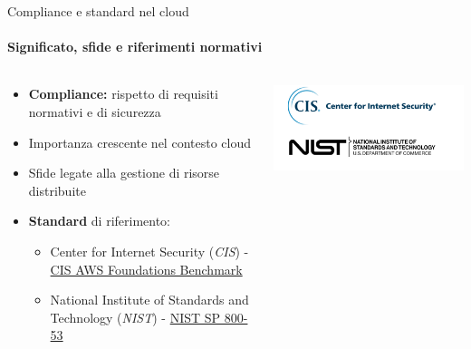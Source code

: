 \documentclass{beamer}
\newcommand{\hrefcol}[2]{\textcolor{cyan}{\href{#1}{#2}}}
\begin{document}
\begin{frame}{Compliance e standard nel cloud}
    \framesubtitle{Significato, sfide e riferimenti normativi}
    \begin{columns}
        \begin{column}{0.6\textwidth}
            \begin{itemize}
                \item \textbf{Compliance:} rispetto di requisiti normativi e di sicurezza
                \item Importanza crescente nel contesto cloud
                \item Sfide legate alla gestione di risorse distribuite
                \item \textbf{Standard} di riferimento:
                \begin{itemize}
                    \item Center for Internet Security (\emph{CIS}) - \hrefcol{https://www.cisecurity.org/}{CIS AWS Foundations Benchmark}
                    \item National Institute of Standards and Technology (\emph{NIST}) - \hrefcol{https://www.nist.gov/}{NIST SP 800-53}
                \end{itemize}
            \end{itemize}
        \end{column}
        \begin{column}{0.4\textwidth}
            \includegraphics[width=\textwidth]{assets/cisnist.png}
        \end{column}
    \end{columns}
\end{frame}
\end{document}
